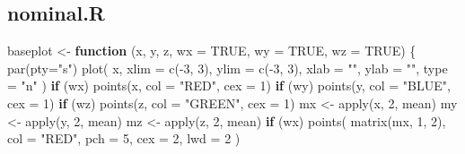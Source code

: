 \documentclass[
  12pt,
]{book}
\newenvironment{Shaded}{\begin{snugshade}}{\end{snugshade}}
\newcommand{\AttributeTok}[1]{\textcolor[rgb]{0.77,0.63,0.00}{#1}}
\newcommand{\ConstantTok}[1]{\textcolor[rgb]{0.00,0.00,0.00}{#1}}
\newcommand{\ControlFlowTok}[1]{\textcolor[rgb]{0.13,0.29,0.53}{\textbf{#1}}}
\newcommand{\DecValTok}[1]{\textcolor[rgb]{0.00,0.00,0.81}{#1}}
\newcommand{\FunctionTok}[1]{\textcolor[rgb]{0.00,0.00,0.00}{#1}}
\newcommand{\NormalTok}[1]{#1}
\newcommand{\OtherTok}[1]{\textcolor[rgb]{0.56,0.35,0.01}{#1}}
\newcommand{\SpecialCharTok}[1]{\textcolor[rgb]{0.00,0.00,0.00}{#1}}
\newcommand{\StringTok}[1]{\textcolor[rgb]{0.31,0.60,0.02}{#1}}
\theoremstyle{definition}
\theoremstyle{definition}
\theoremstyle{definition}
\theoremstyle{definition}
\theoremstyle{remark}
\begin{document}
\hypertarget{apcodenominal}{%
\subsection{nominal.R}\label{apcodenominal}}

\begin{Shaded}
\begin{Highlighting}[]
\NormalTok{baseplot }\OtherTok{\textless{}{-}} \ControlFlowTok{function}\NormalTok{ (x,}
\NormalTok{                      y,}
\NormalTok{                      z,}
                      \AttributeTok{wx =} \ConstantTok{TRUE}\NormalTok{,}
                      \AttributeTok{wy =} \ConstantTok{TRUE}\NormalTok{,}
                      \AttributeTok{wz =} \ConstantTok{TRUE}\NormalTok{) \{}
  \FunctionTok{par}\NormalTok{(}\AttributeTok{pty=}\StringTok{"s"}\NormalTok{)}
  \FunctionTok{plot}\NormalTok{(}
\NormalTok{    x,}
    \AttributeTok{xlim =} \FunctionTok{c}\NormalTok{(}\SpecialCharTok{{-}}\DecValTok{3}\NormalTok{, }\DecValTok{3}\NormalTok{),}
    \AttributeTok{ylim =} \FunctionTok{c}\NormalTok{(}\SpecialCharTok{{-}}\DecValTok{3}\NormalTok{, }\DecValTok{3}\NormalTok{),}
    \AttributeTok{xlab =} \StringTok{""}\NormalTok{,}
    \AttributeTok{ylab =} \StringTok{""}\NormalTok{,}
    \AttributeTok{type  =} \StringTok{"n"}
\NormalTok{  )}
  \ControlFlowTok{if}\NormalTok{ (wx)}
    \FunctionTok{points}\NormalTok{(x, }\AttributeTok{col =} \StringTok{"RED"}\NormalTok{, }\AttributeTok{cex =} \DecValTok{1}\NormalTok{)}
  \ControlFlowTok{if}\NormalTok{ (wy)}
    \FunctionTok{points}\NormalTok{(y, }\AttributeTok{col =} \StringTok{"BLUE"}\NormalTok{, }\AttributeTok{cex =} \DecValTok{1}\NormalTok{)}
  \ControlFlowTok{if}\NormalTok{ (wz)}
    \FunctionTok{points}\NormalTok{(z, }\AttributeTok{col =} \StringTok{"GREEN"}\NormalTok{, }\AttributeTok{cex =} \DecValTok{1}\NormalTok{)}
\NormalTok{  mx }\OtherTok{\textless{}{-}} \FunctionTok{apply}\NormalTok{(x, }\DecValTok{2}\NormalTok{, mean)}
\NormalTok{  my }\OtherTok{\textless{}{-}} \FunctionTok{apply}\NormalTok{(y, }\DecValTok{2}\NormalTok{, mean)}
\NormalTok{  mz }\OtherTok{\textless{}{-}} \FunctionTok{apply}\NormalTok{(z, }\DecValTok{2}\NormalTok{, mean)}
  \ControlFlowTok{if}\NormalTok{ (wx)}
    \FunctionTok{points}\NormalTok{(}
      \FunctionTok{matrix}\NormalTok{(mx, }\DecValTok{1}\NormalTok{, }\DecValTok{2}\NormalTok{),}
      \AttributeTok{col =} \StringTok{"RED"}\NormalTok{,}
      \AttributeTok{pch =} \DecValTok{5}\NormalTok{,}
      \AttributeTok{cex =} \DecValTok{2}\NormalTok{,}
      \AttributeTok{lwd =} \DecValTok{2}
\NormalTok{    )}

\end{Highlighting}
\end{Shaded}
\end{document}
